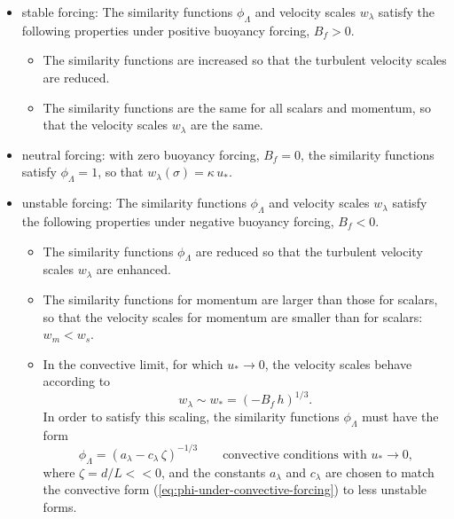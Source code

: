 \begin{itemize}

\item {\sc stable forcing}: The similarity functions
  $\phi_{\Lambda}$ and velocity scales $w_{\lambda}$ satisfy the
  following properties under positive buoyancy forcing, $B_{f}>0$.
 \begin{itemize}
 
 \item The similarity functions are increased so that the turbulent
   velocity scales are reduced.

 \item The similarity functions are the same for all scalars and
   momentum, so that the velocity scales $w_{\lambda}$ are the same.

\end{itemize}

\item {\sc neutral forcing}: with zero buoyancy forcing, $B_{f}=0$,
  the similarity functions satisfy $\phi_{\Lambda} = 1$, so that
  $w_{\lambda}(\sigma) = \kappa \, u_{*}$.

\item {\sc unstable forcing}: The similarity functions
  $\phi_{\Lambda}$ and velocity scales $w_{\lambda}$ satisfy the
  following properties under negative buoyancy forcing, $B_{f}<0$.
 \begin{itemize}

 \item The similarity functions $\phi_{\Lambda}$ are reduced so that
   the turbulent velocity scales $w_{\lambda}$ are enhanced.

 \item The similarity functions for momentum are larger than those for
   scalars, so that the velocity scales for momentum are smaller than
   for scalars: $w_{m} < w_{s}$.

 \item In the convective limit, for which $u_{*} \rightarrow 0$, the
   velocity scales behave according to 
\begin{equation}
 w_{\lambda} \sim w_{*} = (-B_{f} \, h)^{1/3}.
\label{eq:turbulent-w-in-convective-limit}
 \end{equation}
In order to satisfy this scaling, the similarity functions
$\phi_{\Lambda}$ must have the form 
\begin{equation}
  \phi_{\Lambda} = (a_{\lambda} - c_{\lambda} \, \zeta)^{-1/3}  \qquad \mbox{convective conditions with $u_{*} \rightarrow 0$,}
\label{eq:phi-under-convective-forcing}
\end{equation}
where $\zeta = d/L << 0$, and the constants $a_{\lambda}$ and
$c_{\lambda}$ are chosen to match the convective form
(\ref{eq:phi-under-convective-forcing}) to less unstable forms.  


\end{itemize}
\end{itemize}
